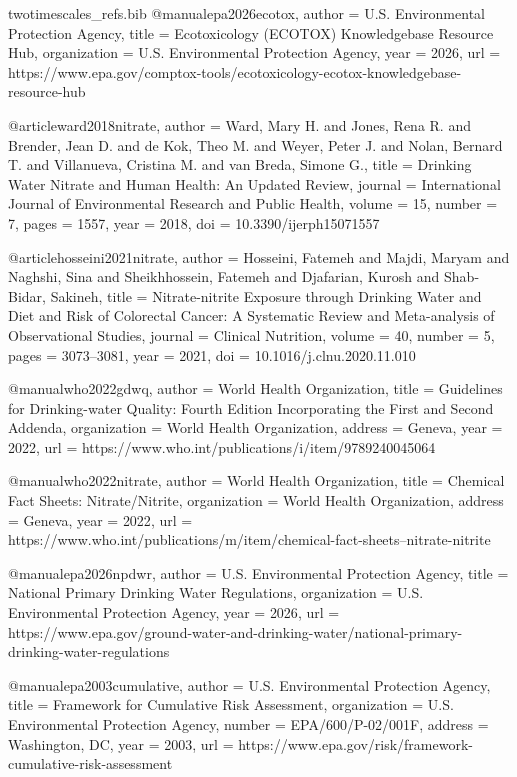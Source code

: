\begin{filecontents*}{twotimescales_refs.bib}
@manual{epa2026ecotox,
  author       = {{U.S. Environmental Protection Agency}},
  title        = {Ecotoxicology (ECOTOX) Knowledgebase Resource Hub},
  organization = {U.S. Environmental Protection Agency},
  year         = {2026},
  url          = {https://www.epa.gov/comptox-tools/ecotoxicology-ecotox-knowledgebase-resource-hub}
}

@article{ward2018nitrate,
  author  = {Ward, Mary H. and Jones, Rena R. and Brender, Jean D. and de Kok, Theo M. and Weyer, Peter J. and Nolan, Bernard T. and Villanueva, Cristina M. and van Breda, Simone G.},
  title   = {Drinking Water Nitrate and Human Health: An Updated Review},
  journal = {International Journal of Environmental Research and Public Health},
  volume  = {15},
  number  = {7},
  pages   = {1557},
  year    = {2018},
  doi     = {10.3390/ijerph15071557}
}

@article{hosseini2021nitrate,
  author  = {Hosseini, Fatemeh and Majdi, Maryam and Naghshi, Sina and Sheikhhossein, Fatemeh and Djafarian, Kurosh and Shab-Bidar, Sakineh},
  title   = {Nitrate-nitrite Exposure through Drinking Water and Diet and Risk of Colorectal Cancer: A Systematic Review and Meta-analysis of Observational Studies},
  journal = {Clinical Nutrition},
  volume  = {40},
  number  = {5},
  pages   = {3073--3081},
  year    = {2021},
  doi     = {10.1016/j.clnu.2020.11.010}
}

@manual{who2022gdwq,
  author       = {{World Health Organization}},
  title        = {Guidelines for Drinking-water Quality: Fourth Edition Incorporating the First and Second Addenda},
  organization = {World Health Organization},
  address      = {Geneva},
  year         = {2022},
  url          = {https://www.who.int/publications/i/item/9789240045064}
}

@manual{who2022nitrate,
  author       = {{World Health Organization}},
  title        = {Chemical Fact Sheets: Nitrate/Nitrite},
  organization = {World Health Organization},
  address      = {Geneva},
  year         = {2022},
  url          = {https://www.who.int/publications/m/item/chemical-fact-sheets--nitrate-nitrite}
}

@manual{epa2026npdwr,
  author       = {{U.S. Environmental Protection Agency}},
  title        = {National Primary Drinking Water Regulations},
  organization = {U.S. Environmental Protection Agency},
  year         = {2026},
  url          = {https://www.epa.gov/ground-water-and-drinking-water/national-primary-drinking-water-regulations}
}

@manual{epa2003cumulative,
  author       = {{U.S. Environmental Protection Agency}},
  title        = {Framework for Cumulative Risk Assessment},
  organization = {U.S. Environmental Protection Agency},
  number       = {EPA/600/P-02/001F},
  address      = {Washington, DC},
  year         = {2003},
  url          = {https://www.epa.gov/risk/framework-cumulative-risk-assessment}
}


\end{filecontents*}
